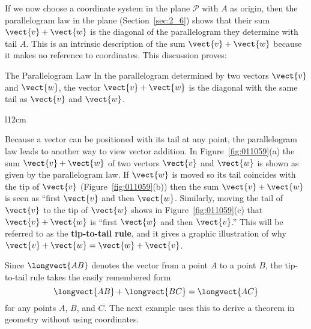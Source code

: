 If we now choose a coordinate system in the plane $\mathcal{P}$ with $A$ as origin, then the parallelogram law in the plane (Section~\ref{sec:2_6}) shows that their sum $\vect{v} + \vect{w}$ is the diagonal of the parallelogram they determine with tail $A$. This is an intrinsic description of the sum $\vect{v} + \vect{w}$ because it makes no reference to coordinates. This discussion proves:

\begin{theorem*}[label=thm:011055]{The Parallelogram Law}
In the parallelogram determined by two vectors $\vect{v}$ and $\vect{w}$, the vector $\vect{v} + \vect{w}$ is the diagonal with the same tail as $\vect{v}$ and $\vect{w}$.
\end{theorem*}

\begin{wrapfigure}{l}{12cm} 
\centering

\caption{\label{fig:011059}}
\end{wrapfigure}

Because  a vector can be positioned with its tail at any point, the 
parallelogram law leads to another way to view vector addition. In Figure~\ref{fig:011059}(a) the sum $\vect{v} + \vect{w}$ of two vectors $\vect{v}$ and $\vect{w}$ is shown as given by the parallelogram law. If $\vect{w}$ is moved so its tail coincides with the tip of $\vect{v}$ (Figure~\ref{fig:011059}(b)) then the sum $\vect{v} + \vect{w}$ is seen as ``first $\vect{v}$ and then $\vect{w}$. Similarly, moving the tail of $\vect{v}$ to the tip of $\vect{w}$ shows in Figure~\ref{fig:011059}(c) that $\vect{v} + \vect{w}$ is ``first $\vect{w}$ and then $\vect{v}$.'' This will be referred to as the \textbf{tip-to-tail rule}, and it gives a graphic illustration of why $\vect{v} + \vect{w} = \vect{w} + \vect{v}$.

Since $\longvect{AB}$ denotes the vector from a point $A$ to a point $B$, the tip-to-tail rule takes the easily remembered form
\begin{equation*}
\longvect{AB} + \longvect{BC} = \longvect{AC}
\end{equation*}
for any points $A$, $B$, and $C$. The next example uses this to derive a theorem in geometry without using coordinates.

